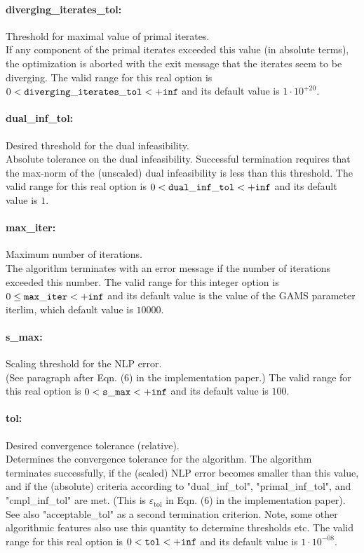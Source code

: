\paragraph{diverging\_iterates\_tol:}\label{sec:diverging_iterates_tol} Threshold for maximal value of primal iterates. $\;$ \\
 If any component of the primal iterates exceeded
this value (in absolute terms), the optimization
is aborted with the exit message that the
iterates seem to be diverging. The valid range for this real option is 
$0 <  {\tt diverging\_iterates\_tol } <  {\tt +inf}$
and its default value is $1 \cdot 10^{+20}$.


\paragraph{dual\_inf\_tol:}\label{sec:dual_inf_tol} Desired threshold for the dual infeasibility. $\;$ \\
 Absolute tolerance on the dual infeasibility.
Successful termination requires that the max-norm
of the (unscaled) dual infeasibility is less than
this threshold. The valid range for this real option is 
$0 <  {\tt dual\_inf\_tol } <  {\tt +inf}$
and its default value is $1$.


\paragraph{max\_iter:}\label{sec:max_iter} Maximum number of iterations. $\;$ \\
 The algorithm terminates with an error message if
the number of iterations exceeded this number. The valid range for this integer option is
$0 \le {\tt max\_iter } <  {\tt +inf}$
and its default value is the value of the GAMS parameter iterlim, which default value is $10000$.


\paragraph{s\_max:}\label{sec:s_max} Scaling threshold for the NLP error. $\;$ \\
 (See paragraph after Eqn. (6) in the
implementation paper.) The valid range for this real option is 
$0 <  {\tt s\_max } <  {\tt +inf}$
and its default value is $100$.


\paragraph{tol:}\label{sec:tol} Desired convergence tolerance (relative). $\;$ \\
 Determines the convergence tolerance for the
algorithm.  The algorithm terminates
successfully, if the (scaled) NLP error becomes
smaller than this value, and if the (absolute)
criteria according to "dual\_inf\_tol",
"primal\_inf\_tol", and "cmpl\_inf\_tol" are met.
 (This is $\varepsilon_\mathrm{tol}$ in Eqn. (6) in
the implementation paper).  See also
"acceptable\_tol" as a second termination
criterion.  Note, some other algorithmic features
also use this quantity to determine thresholds
etc. The valid range for this real option is 
$0 <  {\tt tol } <  {\tt +inf}$
and its default value is $1 \cdot 10^{-08}$.

